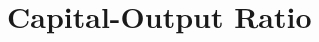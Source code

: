 \documentclass[\topdir/lecture\_notes.tex]{subfiles}
\begin{document}
%
%



\section{Capital-Output Ratio}
\end{document}
